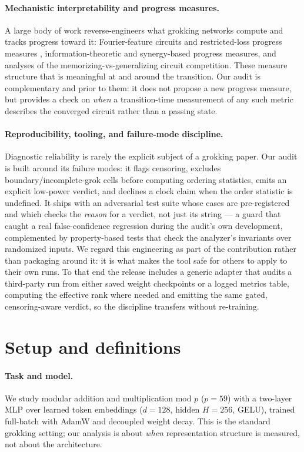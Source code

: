 \documentclass[11pt]{article}
\begin{document}
\paragraph{Mechanistic interpretability and progress measures.} A large body of work reverse-engineers
what grokking networks compute and tracks progress toward it: Fourier-feature circuits and
restricted-loss progress measures \citep{nanda2023progress}, information-theoretic and synergy-based
progress measures, and analyses of the memorizing-vs-generalizing circuit competition. These measure
structure that is meaningful at and around the transition. Our audit is complementary and prior to them:
it does not propose a new progress measure, but provides a check on \emph{when} a transition-time
measurement of any such metric describes the converged circuit rather than a passing state.

\paragraph{Reproducibility, tooling, and failure-mode discipline.} Diagnostic reliability is rarely the
explicit subject of a grokking paper. Our audit is built around its failure modes: it flags censoring,
excludes boundary/incomplete-grok cells before computing ordering statistics, emits an explicit
low-power verdict, and declines a clock claim when the order statistic is undefined. It ships with an
adversarial test suite whose cases are pre-registered and which checks the \emph{reason} for a verdict,
not just its string --- a guard that caught a real false-confidence regression during the audit's own
development, complemented by property-based tests that check the analyzer's invariants over randomized
inputs. We regard this engineering as part of the contribution rather than packaging around it:
it is what makes the tool safe for others to apply to their own runs. To that end the release includes a
generic adapter that audits a third-party run from either saved weight checkpoints or a logged metrics
table, computing the effective rank where needed and emitting the same gated, censoring-aware verdict, so
the discipline transfers without re-training.


\section{Setup and definitions}
\paragraph{Task and model.} We study modular addition and multiplication mod $p$ ($p=59$) with a
two-layer MLP over learned token embeddings ($d=128$, hidden $H=256$, GELU), trained full-batch with
AdamW and decoupled weight decay. This is the standard grokking setting; our analysis is about
\emph{when} representation structure is measured, not about the architecture.
\end{document}
